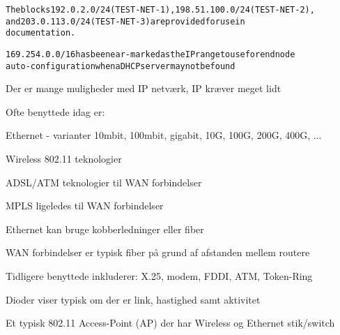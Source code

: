 \documentclass[Screen16to9,17pt]{foils}
\begin{document}
\begin{alltt}
The blocks 192.0.2.0/24 (TEST-NET-1), 198.51.100.0/24 (TEST-NET-2),
and 203.0.113.0/24 (TEST-NET-3) are provided for use in
documentation.

169.254.0.0/16 has been ear-marked as the IP range to use for end node
auto-configuration when a DHCP server may not be found
\end{alltt}





\begin{list1}
\item Der er mange muligheder med IP netværk, IP kræver meget lidt
\item Ofte benyttede idag er:
\begin{list2}
\item Ethernet - varianter 10mbit, 100mbit, gigabit, 10G, 100G, 200G, 400G, ...
\item Wireless 802.11 teknologier
\item ADSL/ATM teknologier til WAN forbindelser
\item MPLS ligeledes til WAN forbindelser
\end{list2}
\item Ethernet kan bruge kobberledninger eller fiber
\item WAN forbindelser er typisk fiber på grund af afstanden mellem routere
\item Tidligere benyttede inkluderer: X.25, modem, FDDI, ATM, Token-Ring
\end{list1}



\centerline{Dioder viser typisk om der er link, hastighed samt aktivitet}



\begin{list1}
\item Et typisk 802.11 Access-Point (AP) der har Wireless og Ethernet stik/switch
\end{list1}

\end{document}
